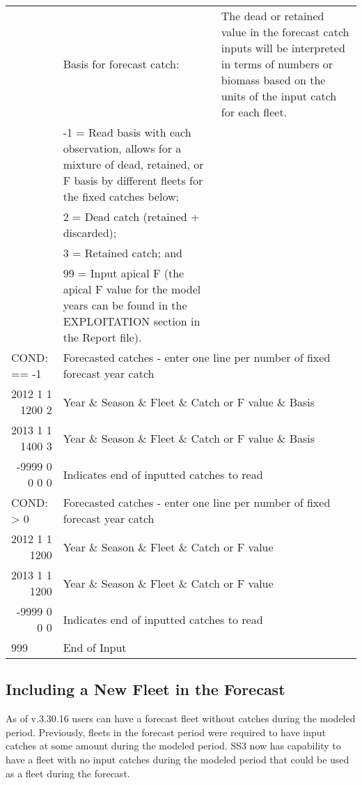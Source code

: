 \begin{landscape}
{\begin{longtable}{p{3.2cm} p{7cm} p{10.8cm}}
  
  \pagebreak
    -1 & Basis for forecast catch: & \multirow{1}{1cm}[-0.25cm]{\parbox{11cm}{ The dead or retained value in the forecast catch inputs will be interpreted in terms of numbers or biomass based on the units of the input catch for each fleet. }}\Tstrut\\
    & -1 = Read basis with each observation, allows for a mixture of dead, retained, or F basis by different fleets for the fixed catches below; & \\
    & 2 = Dead catch (retained + discarded); & \\
    & 3 = Retained catch; and & \\
    & 99 = Input apical F (the apical F value for the model years can be found in the EXPLOITATION section in the Report file). & \Bstrut\\
    
  \hline
  \multicolumn{1}{l}{COND: == -1 }& \multicolumn{2}{l}{Forecasted catches - enter one line per number of fixed forecast year catch} \Tstrut\\
  \multicolumn{1}{r}{2012 1 1 1200 2}  & \multicolumn{2}{l}{Year \& Season \& Fleet \& Catch or F value \& Basis}  \\
  \multicolumn{1}{r}{2013 1 1 1400 3}  & \multicolumn{2}{l}{Year \& Season \& Fleet \& Catch or F value \& Basis}  \\
  \multicolumn{1}{r}{-9999 0 0 0 0}  & \multicolumn{2}{l}{Indicates end of inputted catches to read}  \Bstrut\\

  \multicolumn{1}{l}{COND: > 0 }& \multicolumn{2}{l}{Forecasted catches - enter one line per number of fixed forecast year catch }\Tstrut\\
  \multicolumn{1}{r}{2012  1 1 1200}  & \multicolumn{2}{l}{Year \& Season \& Fleet \& Catch or F value}  \\
  \multicolumn{1}{r}{2013  1 1 1200}  & \multicolumn{2}{l}{Year \& Season \& Fleet \& Catch or F value}  \\
  \multicolumn{1}{r}{-9999 0 0 0}  & \multicolumn{2}{l}{Indicates end of inputted catches to read}  \Bstrut\\
  
  \hline
  999 & End of Input & \Bstrut\\

  \end{longtable}}  
\end{landscape}

\subsection{Including a New Fleet in the Forecast}
As of v.3.30.16 users can have a forecast fleet without catches during the modeled period. Previously, fleets in the forecast period were required to have input catches at some amount during the modeled period. SS3 now has capability to have a fleet with no input catches during the modeled period that could be used as a fleet during the forecast.

